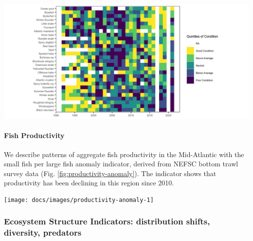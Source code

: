 \documentclass[
  10pt,
]{article}
\let\origfigure\figure
\let\endorigfigure\endfigure
\renewenvironment{figure}[1][2] {
    \expandafter\origfigure\expandafter[H]
} {
    \endorigfigure
}
\begin{document}
\begin{figure}

{\centering \includegraphics[width=1\linewidth]{images/MAB_Condition_allsex_2022_viridis} 

}

\caption{Condition factor for fish species in the MAB based on fall NEFSC bottom trawl survey data. MAB data are missing for 2017 due to survey delays, and no survey was conducted in 2020.}\label{fig:mab-cf}
\end{figure}

\hypertarget{fish-productivity}{%
\paragraph{Fish Productivity}\label{fish-productivity}}

We describe patterns of aggregate fish productivity in the Mid-Atlantic
with the small fish per large fish anomaly indicator, derived from NEFSC
bottom trawl survey data (Fig. \ref{fig:productivity-anomaly}). The
indicator shows that productivity has been declining in this region
since 2010.

\begin{figure}

{\centering \texttt{[image: docs/images/productivity-anomaly-1]} 

}

\caption{Small fish per large fish biomass anomaly in the Mid-Atlantic Bight. The summed anomaly across species is shown by the black line.}\label{fig:productivity-anomaly}
\end{figure}

\hypertarget{ecosystem-structure-indicators-distribution-shifts-diversity-predators}{%
\subsubsection{Ecosystem Structure Indicators: distribution shifts,
diversity,
predators}\label{ecosystem-structure-indicators-distribution-shifts-diversity-predators}}
\end{document}
